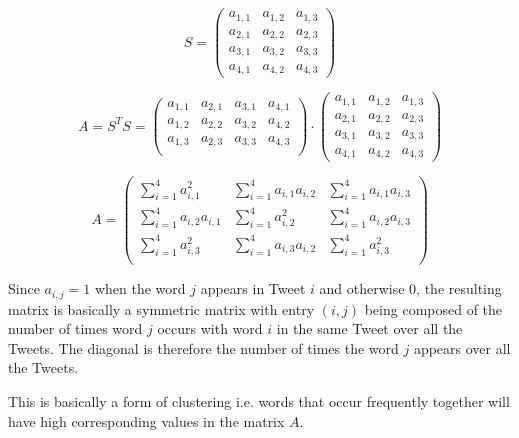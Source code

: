 \documentclass[11pt,a4paper]{article}
\begin{document}
\begin{equation}
S = \left( \begin{matrix}
a_{1, 1} & a_{1, 2} & a_{1, 3} \\ 
a_{2, 1} & a_{2, 2} & a_{2, 3} \\
a_{3, 1} & a_{3, 2} & a_{3, 3} \\
a_{4, 1} & a_{4, 2} & a_{4, 3} 
\end{matrix} \right)
\end{equation}

\begin{equation}
A = S^TS =
 \left( \begin{matrix}
a_{1, 1} & a_{2, 1} & a_{3, 1} & a_{4, 1} \\ 
a_{1, 2} & a_{2, 2} & a_{3, 2} & a_{4, 2} \\ 
a_{1, 3} & a_{2, 3} & a_{3, 3} & a_{4, 3} \\ 

\end{matrix} \right)
\cdot \left( \begin{matrix}
a_{1, 1} & a_{1, 2} & a_{1, 3} \\ 
a_{2, 1} & a_{2, 2} & a_{2, 3} \\
a_{3, 1} & a_{3, 2} & a_{3, 3} \\
a_{4, 1} & a_{4, 2} & a_{4, 3} 
\end{matrix} \right)
\end{equation}


\begin{equation}
A =
\left( \begin{matrix}
\sum_{i=1}^4 a_{i,1}^2& \sum_{i=1}^4 a_{i,1} a_{i,2} &  \sum_{i=1}^4 a_{i,1} a_{i,3} \\ 
\sum_{i=1}^4 a_{i,2}a_{i, 1} & \sum_{i=1}^4 a_{i,2}^2 &  \sum_{i=1}^4 a_{i,2} a_{i,3} \\ 
\sum_{i=1}^4 a_{i,3}^2& \sum_{i=1}^4 a_{i,3} a_{i,2} &  \sum_{i=1}^4  a_{i,3}^2 \\ 
\end{matrix} \right)
\end{equation}

Since $a_{i, j} = 1$ when the word $j$ appears in Tweet $i$ and otherwise 0, the resulting matrix is basically a symmetric matrix with entry $(i, j)$ being composed of the number of times word $j$ occurs with word $i$ in the same Tweet over all the Tweets. The diagonal is  therefore the number of times the word $j$ appears over all the Tweets.

This is basically a form of clustering i.e. words that occur frequently together will have high corresponding values in the matrix $A$.  
\end{document}
